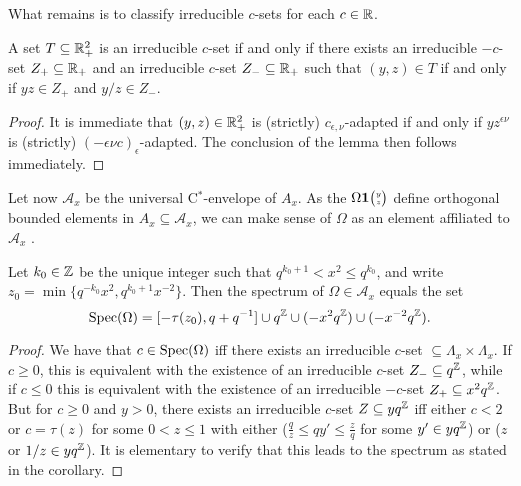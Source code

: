 What remains is to classify irreducible $c$-sets for each $c\in \mathbb{R}$. 

\begin{Lem}\label{LemClass2D} A set $T\subseteq \mathbb{R}_+^2$ is an irreducible $c$-set if and only if there exists an irreducible $-c$-set $Z_+\subseteq \mathbb{R}_+$ and an irreducible $c$-set $Z_-\subseteq \mathbb{R}_+$ such that $(y,z)\in T$ if and only if $yz\in Z_+$ and $y/z\in Z_-$.
\end{Lem} 

\begin{proof} It is immediate that $(y,z)\in \mathbb{R}_+^2$ is (strictly) $c_{\epsilon,\nu}$-adapted if and only if $yz^{\epsilon\nu}$ is (strictly) $(-\epsilon\nu c)_{\epsilon}$-adapted. The conclusion of the lemma then follows immediately.
\end{proof}

Let now $\mathcal{A}_x$ be the universal C$^*$-envelope of $A_x$. As the $\Omega\mathbf{1}{\tiny {\begin{pmatrix} y\\z\end{pmatrix}}}$ define orthogonal bounded elements in $A_x\subseteq \mathcal{A}_x$, we can make sense of $\Omega$ as an element affiliated to $\mathcal{A}_x$ \cite{Wor2}. 

\begin{Cor} Let $k_0\in \mathbb{Z}$ be the unique integer such that $q^{k_0+1}<x^2\leq q^{k_0}$, and write $z_{0} = \min \{q^{-k_0}x^2,q^{k_0+1}x^{-2}\}$. Then the spectrum of $\Omega \in \mathcal{A}_x$ equals the set \[\operatorname{\mathrm{Spec}}(\Omega) = \lbrack -\tau(z_0),q+q^{-1}\rbrack \cup q^{\mathbb{Z}}\cup (-x^2q^{\mathbb{Z}}) \cup (-x^{-2}q^{\mathbb{Z}}).\]
\end{Cor}
\begin{proof} We have that $c \in \operatorname{\mathrm{Spec}}(\Omega)$ iff there exists an irreducible $c$-set $\subseteq \Lambda_x\times \Lambda_x$. If $c\geq 0$, this is equivalent with the existence of an irreducible $c$-set $Z_- \subseteq q^{\mathbb{Z}}$, while if $c\leq 0$ this is equivalent with the existence of an irreducible $-c$-set $Z_+ \subseteq x^2q^{\mathbb{Z}}$. But for $c\geq0$ and $y>0$, there exists an irreducible $c$-set $Z\subseteq yq^{\mathbb{Z}}$ iff either $c<2$ or $c=\tau(z)$ for some $0<z\leq 1$ with either ($\frac{q}{z}\leq qy' \leq \frac{z}{q}$ for some $y'\in yq^{\mathbb{Z}}$) or ($z$ or $1/z \in yq^{\mathbb{Z}}$). It is elementary to verify that this leads to the spectrum as stated in the corollary.
\end{proof}



